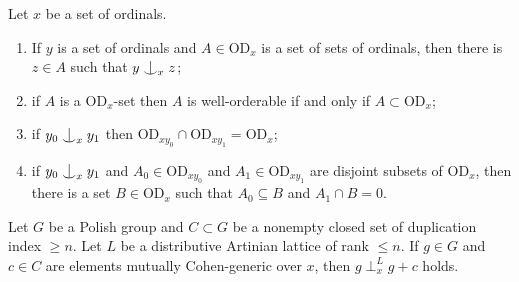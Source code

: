 \documentclass[10pt,a4paper]{amsart}
\newcommand{\forkindep}[1][]{%
  \mathrel{
    \mathop{
      \vcenter{
        \hbox{\oalign{\noalign{\kern-.3ex}\hfil$\vert$\hfil\cr
              \noalign{\kern-.7ex}
              $\smile$\cr\noalign{\kern-.3ex}}}
      }
    }\displaylimits_{#1}
  }
}
\newcommand{\vd}{\mathrm{OD}}
\begin{document}
\begin{fact}
\label{fact1}
Let $x$ be a set of ordinals.

\begin{enumerate}
\item If $y$ is a set of ordinals and $A\in\vd_x$ is a set of sets of ordinals, then there is $z\in A$ such that $y\forkindep[x]z$;
\item if $A$ is a $\vd_x$-set then $A$ is well-orderable if and only if $A\subset\vd_x$;
\item if $y_0\forkindep[x]y_1$ then $\vd_{xy_0}\cap\vd_{xy_1}=\vd_x$;
\item if $y_0\forkindep[x]y_1$ and $A_0\in\vd_{xy_0}$ and $A_1\in\vd_{xy_1}$ are disjoint subsets of $\vd_x$, then there is a set $B\in\vd_x$ such that $A_0\subseteq B$ and $A_1\cap B=0$.
\end{enumerate}
\end{fact}

\begin{proposition}
\label{ab}
Let $G$ be a Polish group and $C\subset G$ be a nonempty closed set of duplication index $\geq n$. Let $L$ be a distributive Artinian lattice of rank $\leq n$. If $g\in G$ and $c\in C$ are elements mutually Cohen-generic over $x$, then $g\perp^L_xg+c$ holds.
\end{proposition}
\end{document}
